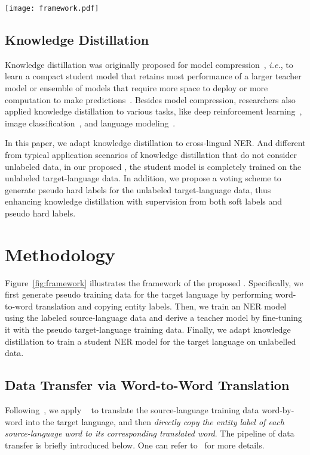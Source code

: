 \documentclass{article}
\newcommand\ie{\textit{i.e.}}
\newcommand\unitrans{\text{UniTrans}}
\begin{document}
\begin{figure*}[t]
    \centering
    \texttt{[image: framework.pdf]}
    \caption{Framework of the proposed \unitrans{}. (a) Unifying model transfer and data transfer. (b) Knowledge distillation on unlabeled data.
    }
\label{fig:framework}
\end{figure*}

\subsection{Knowledge Distillation}
Knowledge distillation was originally proposed for model compression~\cite{bucilu2006model}, \ie, to learn a compact student model that retains most performance of a larger teacher model or ensemble of models that require more space to deploy or more computation to make predictions~\cite{rusu2015policy,hinton2015distilling,sanh2019distilbert}. 
Besides model compression, researchers also applied knowledge distillation to various tasks, like deep reinforcement learning~\cite{rusu2015policy}, image classification~\cite{hinton2015distilling}, and language modeling~\cite{sanh2019distilbert}.


In this paper, we adapt knowledge distillation to cross-lingual NER.
And different from typical application scenarios of knowledge distillation that do not consider unlabeled data, in our proposed \unitrans{}, the student model is completely trained on the unlabeled target-language data.
In addition, we propose a voting scheme to generate pseudo hard labels for the unlabeled target-language data, thus enhancing knowledge distillation with supervision from both soft labels and pseudo hard labels.

\section{Methodology}

Figure~\ref{fig:framework} illustrates the framework of the proposed \unitrans{}. 
Specifically, we first generate pseudo training data for the target language by performing word-to-word translation and copying entity labels. 
Then, we train an NER model using the labeled source-language data and derive a teacher model by fine-tuning it with the pseudo target-language training data. 
Finally, we adapt knowledge distillation to train a student NER model for the target language on unlabelled data. 


\subsection{Data Transfer via Word-to-Word Translation}
\label{sec:data_trans}
Following~\cite{xie2018neural}, we apply ~\cite{lample2018word} to translate the source-language training data word-by-word into the target language, and then \textit{directly copy the entity label of each source-language word to its corresponding translated word}. 
The pipeline of data transfer is briefly introduced below. One can refer to~\cite{lample2018word} for more details.
\end{document}
